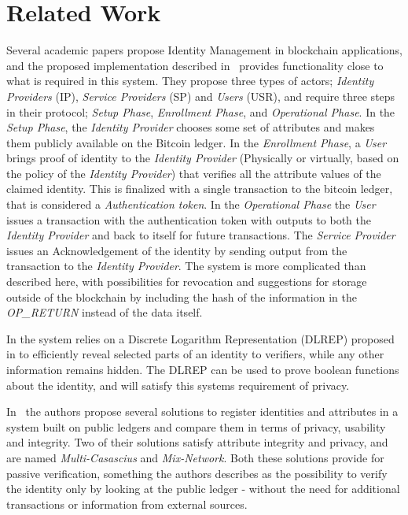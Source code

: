 \chapter{Related Work}
\label{chap:related_work}
Several academic papers propose Identity Management in blockchain applications, and the proposed implementation described in~\cite{Augot2017} provides functionality close to what is required in this system. They propose three types of actors; \textit{Identity Providers} (IP), \textit{Service Providers} (SP) and \textit{Users} (USR), and require three steps in their protocol; \textit{Setup Phase}, \textit{Enrollment Phase}, and \textit{Operational Phase}. In the \textit{Setup Phase}, the \textit{Identity Provider} chooses some set of attributes and makes them publicly available on the Bitcoin ledger. In the \textit{Enrollment Phase}, a \textit{User} brings proof of identity to the \textit{Identity Provider} (Physically or virtually, based on the policy of the \textit{Identity Provider}) that verifies all the attribute values of the claimed identity. This is finalized with a single transaction to the bitcoin ledger, that is considered a \textit{Authentication token}.  In the \textit{Operational Phase} the \textit{User} issues a transaction with the authentication token with outputs to both the \textit{Identity Provider} and back to itself for future transactions. The \textit{Service Provider} issues an Acknowledgement of the identity by sending output from the transaction to the \textit{Identity Provider}. The system is more complicated than described here, with possibilities for revocation and suggestions for storage outside of the blockchain by including the hash of the information in the \textit{OP\_RETURN} instead of the data itself. 

In \cite{Augot2017} the system relies on a Discrete Logarithm Representation (DLREP) proposed in \cite{Brands2000} to efficiently reveal selected parts of an identity to verifiers, while any other information remains hidden. The DLREP can be used to prove boolean functions about the identity, and will satisfy this systems requirement of privacy. 

In~\cite{Azouvi2017} the authors propose several solutions to register identities and attributes in a system built on public ledgers and compare them in terms of privacy, usability and integrity. Two of their solutions satisfy attribute integrity and privacy, and are named \textit{Multi-Casascius} and \textit{Mix-Network}. Both these solutions provide for passive verification, something the authors describes as the possibility to verify the identity only by looking at the public ledger - without the need for additional transactions or information from external sources.

